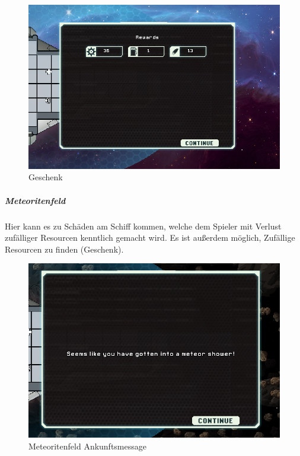 \documentclass[fontsize=12pt,paper=a4,twoside]{scrartcl}
\begin{document}
\begin{figure}[H]
\centering
\includegraphics[width=0.8\linewidth]{DasSpiel/Karte/nebularPresent.png}
\caption{Geschenk}
\end{figure} 

\subparagraph{Meteoritenfeld} Hier kann es zu Schäden am Schiff kommen, welche dem Spieler mit Verlust zufälliger Resourcen kenntlich gemacht wird. Es ist außerdem möglich, Zufällige Resourcen zu finden (Geschenk).

\begin{figure}[H]
\centering
\includegraphics[width=1\linewidth]{DasSpiel/Karte/meteor.png}
\caption{Meteoritenfeld Ankunftsmessage}
\end{figure} 
\end{document}
